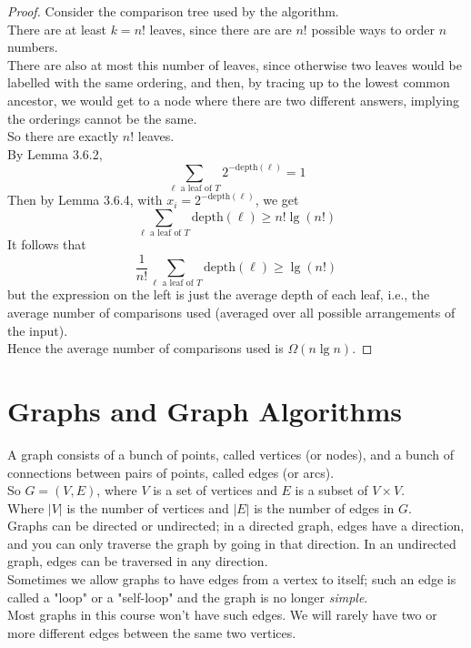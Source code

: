 \documentclass[12pt]{article}
\theoremstyle{plain}
\theoremstyle{definition}
\begin{document}
\begin{proof}
Consider the comparison tree used by the algorithm. \\
There are at least $k = n!$ leaves, since there are are $n!$ possible ways to order $n$ numbers. \\
There are also at most this number of leaves, since otherwise two leaves would be labelled with the same ordering, and then, by tracing up to the lowest common ancestor, we would get to a node where there are two different answers, implying the orderings cannot be the same. \\
So there are exactly $n!$ leaves. \\
By Lemma 3.6.2,
$$\sum_{\ell \text{ a leaf of } T}2^{-\text{depth}(\ell)} = 1$$
Then by Lemma 3.6.4, with $x_{i} = 2^{-\text{depth}(\ell)}$, we get
$$\sum_{\ell \text{ a leaf of } T}\text{depth}(\ell) \geq n! \lg(n!)$$
It follows that
$$\frac{1}{n!}\sum_{\ell \text{ a leaf of } T}\text{depth}(\ell) \geq \lg(n!)$$
but the expression on the left is just the average depth of each leaf, i.e., the average number of comparisons used (averaged over all possible arrangements of the input). \\
Hence the average number of comparisons used is $\Omega(n \lg{n})$.
\end{proof}

\newpage
\section{Graphs and Graph Algorithms}
A graph consists of a bunch of points, called vertices (or nodes), and a bunch of connections between pairs of points, called edges (or arcs). \\
So $G = (V, E)$, where $V$ is a set of vertices and $E$ is a subset of $V \times V$. \\
Where $|V|$ is the number of vertices and $|E|$ is the number of edges in $G$. \\

Graphs can be directed or undirected;
in a directed graph, edges have a direction, and you can only traverse the graph by going in that direction.
In an undirected graph, edges can be traversed in any direction. \\

Sometimes we allow graphs to have edges from a vertex to itself;
such an edge is called a "loop" or a "self-loop" and the graph is no longer \emph{simple}. \\
Most graphs in this course won't have such edges.
We will rarely have two or more different edges between the same two vertices. \\
\end{document}
